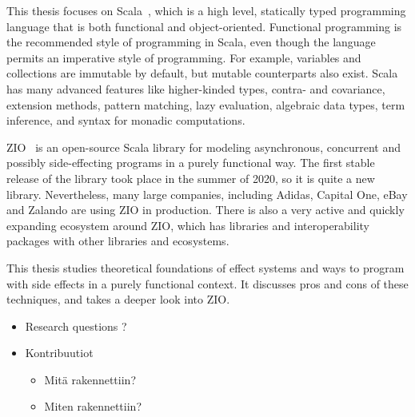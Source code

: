 This thesis focuses on Scala~\cite{scala}, which is a high level, statically typed programming language that is both functional and object-oriented. Functional programming is the recommended style of programming in Scala, even though the language permits an imperative style of programming. For example, variables and collections are immutable by default, but mutable counterparts also exist. Scala has many advanced features like higher-kinded types, contra- and covariance, extension methods, pattern matching, lazy evaluation, algebraic data types, term inference, and syntax for monadic computations.

ZIO~\cite{zio} is an open-source Scala library for modeling asynchronous, concurrent and possibly side-effecting programs in a purely functional way. The first stable release of the library took place in the summer of 2020, so it is quite a new library. Nevertheless, many large companies, including Adidas, Capital One, eBay and Zalando are using ZIO in production. There is also a very active and quickly expanding ecosystem around ZIO, which has libraries and interoperability packages with other libraries and ecosystems.

This thesis studies theoretical foundations of effect systems and ways to program with side effects in a purely functional context. It discusses pros and cons of these techniques, and takes a deeper look into ZIO. 


\begin{itemize}
    \item Research questions ?

    \item Kontribuutiot
    \begin{itemize}
        \item Mitä rakennettiin?
        \item Miten rakennettiin?
    \end{itemize}
\end{itemize}
